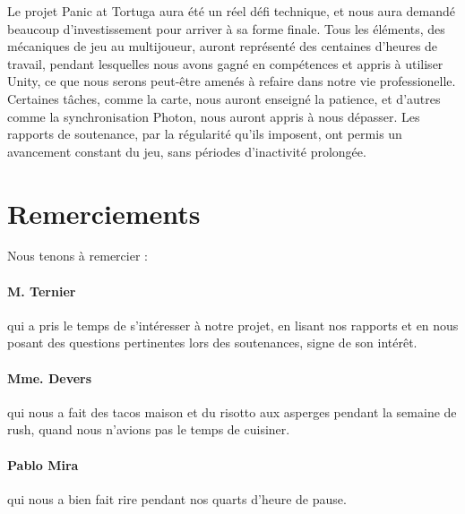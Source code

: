 \documentclass[12pt, french]{article}
\begin{document}
Le projet Panic at Tortuga aura été un réel défi technique, et nous aura demandé beaucoup d'investissement pour arriver à sa forme finale. Tous les éléments, 
des mécaniques de jeu au multijoueur, auront représenté des centaines d'heures de travail, pendant lesquelles nous avons gagné en compétences et appris à utiliser 
Unity, ce que nous serons peut-être amenés à refaire dans notre vie professionelle. Certaines tâches, comme la carte, nous auront enseigné la patience, et d'autres 
comme la synchronisation Photon, nous auront appris à nous dépasser. Les rapports de soutenance, par la régularité qu'ils imposent, ont permis un avancement 
constant du jeu, sans périodes d'inactivité prolongée. 

\section{Remerciements}

Nous tenons à remercier :


\paragraph{M. Ternier}qui a pris le temps de s'intéresser 
à notre projet, en lisant nos rapports et en nous posant des questions pertinentes lors des soutenances, signe 
de son intérêt. 

\paragraph{Mme. Devers}qui nous a fait des tacos maison et du risotto aux asperges 
pendant la semaine de rush, quand nous n'avions pas le temps de cuisiner.

\paragraph{Pablo Mira}qui nous a bien fait rire pendant nos quarts d'heure de pause.



\listoffigures
\listoftables
\end{document}
